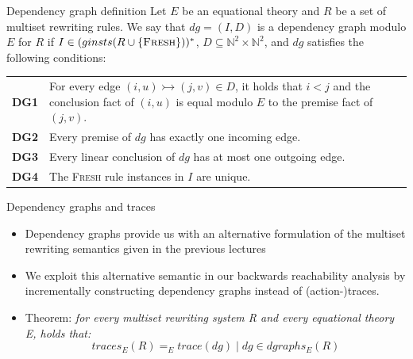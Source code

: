 \documentclass[11pt,aspectratio=169]{beamer}
\begin{document}
\begin{frame}[fragile]{Dependency graph definition}
    Let $E$ be an equational theory and $R$ be a set of multiset rewriting 
    rules. We say that $dg = (I, D)$ is a dependency graph modulo $E$ for $R$ 
    if $I \in (ginsts(R \cup \{\textsc{Fresh}\}))^{*}$, $D \subseteq \mathbb{N}
    ^2 \times \mathbb{N}^2$, and $dg$ satisfies the following conditions:

    \begin{table}
        \raggedright
        \begin{tabular}{ll}
            \textbf{DG1} & \multicolumn{1}{p{.85\textwidth}}{
                For every edge $(i, u) \rightarrowtail (j, v) \in D$, it holds 
                that $i < j$ and the conclusion fact of $(i, u)$ is equal 
                modulo $E$ to the premise fact of $(j, v)$.
            } \\
            \textbf{DG2} & \multicolumn{1}{p{.85\textwidth}}{
                Every premise of $dg$ has exactly one incoming edge.
            } \\
            \textbf{DG3} & \multicolumn{1}{p{.85\textwidth}}{
                Every linear conclusion of $dg$ has at most one outgoing edge.
            } \\
            \textbf{DG4} & \multicolumn{1}{p{.85\textwidth}}{
                The \textsc{Fresh} rule instances in $I$ are unique.
            }
        \end{tabular}
    \end{table}
\end{frame}

\begin{frame}[fragile]{Dependency graphs and traces}
    \begin{itemize}
        \item Dependency graphs provide us with an alternative formulation of 
              the multiset rewriting semantics given in the previous lectures
        \item We exploit this alternative semantic in our backwards 
              reachability analysis by incrementally constructing dependency 
              graphs instead of (action-)traces.
        \item Theorem: \textit{for every multiset rewriting system R and every 
              equational theory E, holds that:}
              \[traces_E (R) =_E {trace(dg)\;|\;dg \in dgraphs_E (R)}\]
    \end{itemize}
\end{frame}
\end{document}

